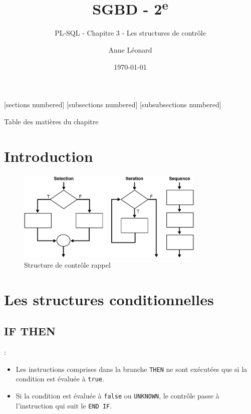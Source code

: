 \documentclass[10pt]{beamer}
\title{SGBD - 2\textsuperscript{e}}
\subtitle{PL-SQL - Chapitre 3 - Les structures de contrôle}
\date{\today}
\author{Anne Léonard}
\institute{Haute École de la Province de Liège}
\begin{document}
\maketitle

[sections numbered]
[subsections numbered]
[subsubsections numbered]
\begin{frame}[allowframebreaks]{Table des matières du chapitre}
    \tableofcontents[subsectionstyle=show/show/hide,subsubsectionstyle=show/show/hide,]
\end{frame}

\section{Introduction}
\tocss
\begin{frame}{\secname}
    \begin{figure}
        \begin{center}
            \includegraphics[width=0.8\textwidth]{../assets/img/structure-controle-rappel.png}
            \caption{Structure de contrôle rappel}
        \end{center}
    \end{figure}
\end{frame}

\section{Les structures conditionnelles}
\tocss
\subsection{IF THEN}
\begin{frame}{\secname : \subsecname}
    \begin{itemize}
        \item   Les instructions comprises dans la branche \lstinline[language=plsql]!THEN! ne sont exécutées que si la condition est évaluée à \lstinline[language=plsql]!true!.
        \item Si la condition est évaluée à \lstinline[language=plsql]!false! ou \lstinline[language=plsql]!UNKNOWN!, le contrôle passe à l'instruction qui suit le \lstinline[language=plsql]!END IF!.
    \end{itemize}
\end{frame}
\end{document}
